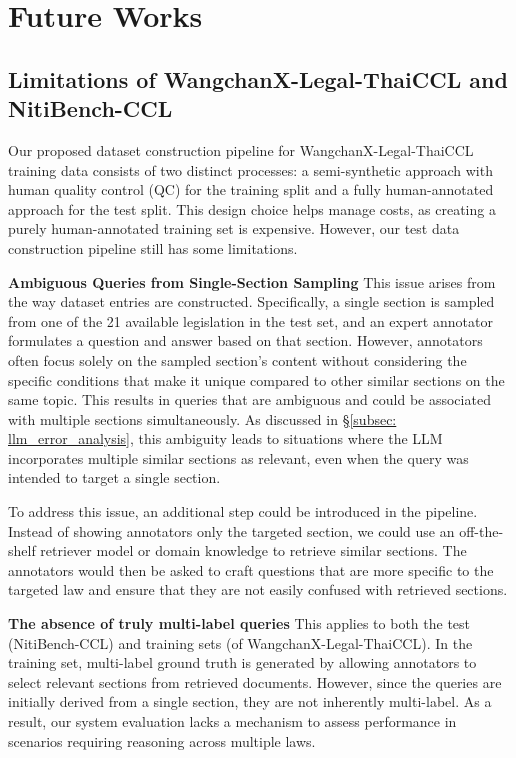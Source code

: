 \section{Future Works}
\subsection{Limitations of WangchanX-Legal-ThaiCCL and NitiBench-CCL}
\label{subsec: wcx_limitation}

Our proposed dataset construction pipeline for WangchanX-Legal-ThaiCCL training data consists of two distinct processes: a semi-synthetic approach with human quality control (QC) for the training split and a fully human-annotated approach for the test split. 
%
This design choice helps manage costs, as creating a purely human-annotated training set is expensive. 
%
However, our test data construction pipeline still has some limitations.

\textbf{Ambiguous Queries from Single-Section Sampling}
%
This issue arises from the way dataset entries are constructed. 
%
Specifically, a single section is sampled from one of the 21 available legislation in the test set, and an expert annotator formulates a question and answer based on that section. 
%
However, annotators often focus solely on the sampled section's content without considering the specific conditions that make it unique compared to other similar sections on the same topic. 
%
This results in queries that are ambiguous and could be associated with multiple sections simultaneously. 
%
As discussed in \S\ref{subsec: llm_error_analysis}, this ambiguity leads to situations where the LLM incorporates multiple similar sections as relevant, even when the query was intended to target a single section. 

To address this issue, an additional step could be introduced in the pipeline. 
%
Instead of showing annotators only the targeted section, we could use an off-the-shelf retriever model or domain knowledge to retrieve similar sections. 
%
The annotators would then be asked to craft questions that are more specific to the targeted law and ensure that they are not easily confused with retrieved sections.

\textbf{The absence of truly multi-label queries} 
%
This applies to both the test (NitiBench-CCL) and training sets (of WangchanX-Legal-ThaiCCL). 
%
In the training set, multi-label ground truth is generated by allowing annotators to select relevant sections from retrieved documents. 
%
However, since the queries are initially derived from a single section, they are not inherently multi-label. 
%
As a result, our system evaluation lacks a mechanism to assess performance in scenarios requiring reasoning across multiple laws. 

